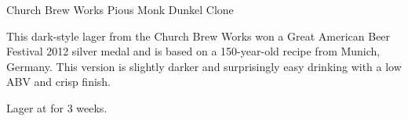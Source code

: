 \stylesection{\stylemunichdunkel}

\begin{recipe}{Church Brew Works Pious Monk Dunkel Clone}

\begin{aboutblock}
This dark-style lager from the Church Brew Works won a Great American Beer
Festival 2012 silver medal and is based on a 150-year-old recipe from Munich,
Germany. This version is slightly darker and surprisingly easy drinking with
a low ABV and crisp finish. \sourceaha
\end{aboutblock}


\begin{methodandtiming}
 
\begin{mashsteps}
\mashdecoctthick{}
\mashdecoctboil{}

\end{mashsteps}

\begin{fermentationsteps}
\end{fermentationsteps}

\begin{directions}
Lager at  for 3 weeks.
\end{directions}

\end{methodandtiming}

\recipebreak

\begin{ingredientsblock}

\begin{malts}
\end{malts}

\begin{hops}
\end{hops}


\begin{twists}
\end{twists}

\end{ingredientsblock}

\end{recipe}
